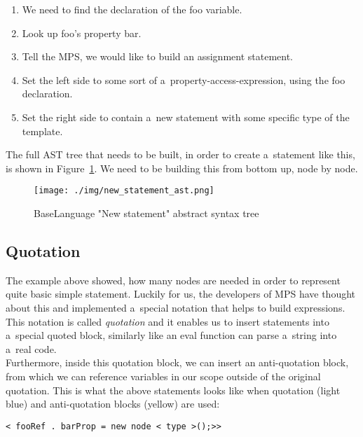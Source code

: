 \begin{enumerate}
	\item We need to find the declaration of the foo variable.
	\item Look up foo's property bar.
	\item Tell the MPS, we would like to build an assignment statement.
	\item Set the left side to some sort of a~property-access-expression, using the foo declaration.
	\item Set the right side to contain a~new statement with some specific type of the template.
\end{enumerate}

The full AST tree that needs to be built, in order to create a~statement like this, is shown in Figure~\ref{fig:new_ast}.
We need to be building this from bottom up, node by node.

\begin{figure}[h]
	\centering
	\hspace*{-18mm}
	\texttt{[image: ./img/new\_statement\_ast.png]}
	\caption{BaseLanguage "New statement" abstract syntax tree}
	\label{fig:new_ast}
\end{figure}

\subsection{Quotation}
The example above showed, how many nodes are needed in order to represent quite basic simple statement.
Luckily for us, the developers of MPS have thought about this and implemented a~special notation that helps to build expressions.
This notation is called \textit{quotation} and it enables us to insert statements into a~special quoted block, similarly like an eval function can parse a~string into a~real code.
\\

Furthermore, inside this quotation block, we can insert an anti-quotation block, from which we can reference variables in our scope outside of the original quotation.
This is what the above statements looks like when quotation (light blue) and anti-quotation blocks (yellow) are used:

\begin{center}
	\texttt{\colorbox{cyan!30}{<}\lexerrule{\%(} fooRef \lexerrule{)\%}.\lexerrule{\%(} barProp \lexerrule{)\%} = new node <\lexerrule{\textasciicircum(} type \lexerrule{)\textasciicircum}>();>\colorbox{cyan!30}{>}}
\end{center}

